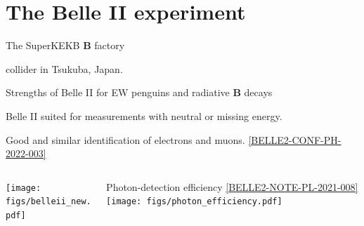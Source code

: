 \section{The Belle II experiment}
{
\begin{frame}{The SuperKEKB $\boldsymbol{B}$ factory}
\bi 
\item {\small \epem collider in Tsukuba, Japan.}
\bi
{}
\ei
{}
\ei
\end{frame}
}
\begin{frame}{{Strengths of Belle II for EW penguins and radiative $\boldsymbol{B}$ decays}}
\bi
\item {\footnotesize Belle II suited for measurements with neutral or missing energy.}
\bi
{}
\ei
\item {\footnotesize Good and similar identification of electrons and muons. \hfill \href{https://docs.belle2.org/record/2895/files/Lepton_identification_Moriond_2022__v2.pdf}{\tiny [BELLE2-CONF-PH-2022-003]}}
\ei
\vspace{0.25cm}
\begin{columns}
\begin{column}{0.5\linewidth}
\centering
\texttt{[image: figs/belleii\_new.pdf]}
\end{column}
\begin{column}{0.5\linewidth}
{\tiny Photon-detection efficiency \href{https://docs.belle2.org/record/2604/files/BELLE2-NOTE-PL-2021-008.pdf}{\tiny [BELLE2-NOTE-PL-2021-008]}}
\centering
\texttt{[image: figs/photon\_efficiency.pdf]}
\end{column}
\end{columns}
\end{frame}
